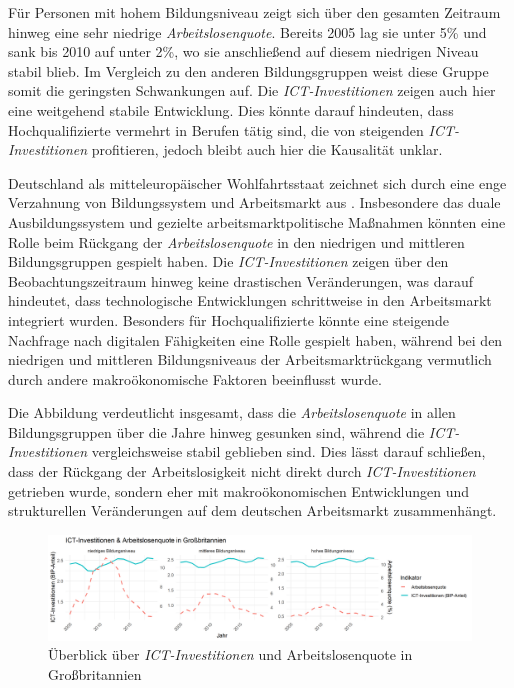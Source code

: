 Für Personen mit hohem Bildungsniveau zeigt sich über den gesamten Zeitraum hinweg 
eine sehr niedrige \textit{Arbeitslosenquote}. Bereits 2005 lag sie unter 5\% und 
sank bis 2010 auf unter 2\%, wo sie anschließend auf diesem niedrigen Niveau stabil blieb. 
Im Vergleich zu den anderen Bildungsgruppen weist diese Gruppe somit die geringsten 
Schwankungen auf. Die \textit{\ac{ICT}-Investitionen} zeigen auch hier eine 
weitgehend stabile Entwicklung. Dies könnte darauf hindeuten, dass Hochqualifizierte 
vermehrt in Berufen tätig sind, die von steigenden \textit{\ac{ICT}-Investitionen} 
profitieren, jedoch bleibt auch hier die Kausalität unklar.

Deutschland als mitteleuropäischer Wohlfahrtsstaat zeichnet sich durch eine enge 
Verzahnung von Bildungssystem und Arbeitsmarkt aus 
\parencite[vgl.][S. 21–22]{hall2001varieties}. Insbesondere das duale Ausbildungssystem 
und gezielte arbeitsmarktpolitische Maßnahmen könnten eine Rolle beim Rückgang der 
\textit{Arbeitslosenquote} in den niedrigen und mittleren Bildungsgruppen gespielt haben. 
Die \textit{\ac{ICT}-Investitionen} zeigen über den Beobachtungszeitraum hinweg keine 
drastischen Veränderungen, was darauf hindeutet, dass technologische Entwicklungen 
schrittweise in den Arbeitsmarkt integriert wurden. Besonders für Hochqualifizierte 
könnte eine steigende Nachfrage nach digitalen Fähigkeiten eine Rolle gespielt 
haben, während bei den niedrigen und mittleren Bildungsniveaus der 
Arbeitsmarktrückgang vermutlich durch andere makroökonomische Faktoren beeinflusst 
wurde.

Die Abbildung verdeutlicht insgesamt, dass die \textit{Arbeitslosenquote} in allen 
Bildungsgruppen über die Jahre hinweg gesunken sind, während die 
\textit{\ac{ICT}-Investitionen} vergleichsweise stabil geblieben sind. Dies lässt darauf 
schließen, dass der Rückgang der Arbeitslosigkeit nicht direkt durch 
\textit{\ac{ICT}-Investitionen} getrieben wurde, sondern eher mit makroökonomischen 
Entwicklungen und strukturellen Veränderungen auf dem deutschen Arbeitsmarkt 
zusammenhängt.

\begin{figure}[htbp]
    \centering
    \includegraphics[width=\textwidth]{assets/plot_uk_final.png}
    \caption{Überblick über \textit{\ac{ICT}-Investitionen} und Arbeitslosenquote in 
    Großbritannien}
    \label{fig:uk}
\end{figure}

